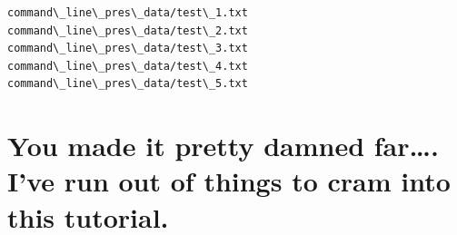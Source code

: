 \documentclass{article}
\begin{document}
    \begin{Verbatim}[commandchars=\\\{\}]
command\_line\_pres\_data/test\_1.txt
command\_line\_pres\_data/test\_2.txt
command\_line\_pres\_data/test\_3.txt
command\_line\_pres\_data/test\_4.txt
command\_line\_pres\_data/test\_5.txt
    \end{Verbatim}

    \section{You made it pretty damned far\ldots{}. I've run out of things
to cram into this
tutorial.}\label{you-made-it-pretty-damned-far.-ive-run-out-of-things-to-cram-into-this-tutorial.}





    
\end{document}
